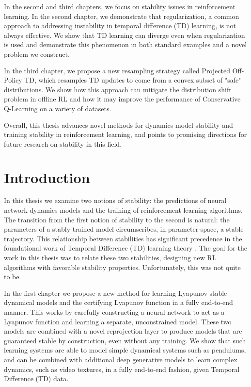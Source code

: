 \documentclass[11pt]{book}
\begin{document}
In the second and third chapters, we focus on stability issues in reinforcement learning. In the second chapter, we demonstrate that regularization, a common approach to addressing instability in temporal difference (TD) learning, is not always effective. We show that TD learning can diverge even when regularization is used and demonstrate this phenomenon in both standard examples and a novel problem we construct.

In the third chapter, we propose a new resampling strategy called Projected Off-Policy TD, which resamples TD updates to come from a convex subset of "safe" distributions. We show how this approach can mitigate the distribution shift problem in offline RL and how it may improve the performance of Conservative Q-Learning on a variety of datasets.

Overall, this thesis advances novel methods for dynamics model stability and training stability in reinforcement learning, and points to promising directions for future research on stability in this field.


\clearpage

\tableofcontents

\cleardoublepage

\linenumbers

\chapter{Introduction}

In this thesis we examine two notions of stability: the predictions of neural network dynamics models and the training of reinforcement learning algorithms. The transition from the first notion of stability to the second is natural: the parameters of a stably trained model circumscribes, in parameter-space, a stable trajectory.
This relationship between stabilities has significant precedence in the foundational work of Temporal Difference (TD) learning theory \cite{tsitsiklis1996analysis}. The goal for the work in this thesis was to relate these two stabilities, designing new RL algorithms with favorable stability properties.
Unfortunately, this was not quite to be.

In the first chapter we propose a new method for learning Lyapunov-stable dynamical models and the certifying Lyapunov function in a fully end-to-end manner.
This works by carefully constructing a neural network to act as a Lyapunov function and learning a separate, unconstrained model. These two models are combined with a novel reprojection layer to produce models that are guaranteed stable by construction, even without any training. We show that such learning systems are able to model simple dynamical systems such as pendulums, and can be combined with additional deep generative models to learn complex dynamics, such as video textures, in a fully end-to-end fashion, given Temporal Difference (TD) data.
\end{document}
